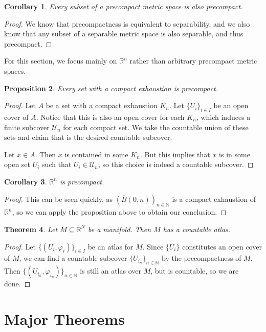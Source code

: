 \documentclass{article}
\newcommand{\cl}[1]{\overline{#1}}
\theoremstyle{plain} %
\newtheorem{thm}{Theorem}
\numberwithin{thm}{section} %
\newtheorem{prop}[thm]{Proposition}
\newtheorem{cor}[thm]{Corollary}
\theoremstyle{definition}
\begin{document}
    \begin{cor}
        Every subset of a precompact metric space is also precompact.
    \end{cor}
    \begin{proof}
        We know that precompactness is equivalent to separability, and we also know that any subset of a separable metric space is also separable, and thus precompact.
    \end{proof}
    For this section, we focus mainly on \(\mathbb{R}^n\) rather than arbitrary precompact metric spaces.
    \begin{prop}
        Every set with a compact exhaustion is precompact.
    \end{prop}
    \begin{proof}
        Let \(A\) be a set with a compact exhaustion \(K_n\). Let \(\{ U_i \} _{i \in I}\) be an open cover of \(A\). Notice that this is also an open cover for each \(K_n\), which induces a finite subcover \(\mathcal{U}_n\) for each compact set. We take the countable union of these sets and claim that is the desired countable subcover.

        Let \(x \in A\). Then \(x\) is contained in some \(K_n\). But this implies that \(x\) is in some open set \(U_i\) such that \(U_i \in \mathcal{U}_n\), so this choice is indeed a countable subcover.
    \end{proof}
    \begin{cor}
        \(\mathbb{R}^n\) is precompact.
    \end{cor}
    \begin{proof}
        This can be seen quickly, as \(\left( \cl{B}(0, n) \right)_{n \in \mathbb{N}}\) is a compact exhaustion of \(\mathbb{R}^n\), so we can apply the proposition above to obtain our conclusion.
    \end{proof}
    \begin{thm}
        Let \(M \subseteq \mathbb{R}^N\) be a manifold. Then \(M\) has a countable atlas.
    \end{thm}
    \begin{proof}
        Let \(\{ (U_i , \varphi _i) \}_{i \in I}\) be an atlas for \(M\). Since \(\{ U_i \}\) constitutes an open cover of \(M\), we can find a countable subcover \(\{ U_{i_n} \}_{n \in \mathbb{N}}\) by the precompactness of \(M\). Then \(\{ (U_{i_n}, \varphi _{i_n}) \}_{n \in \mathbb{N}}\) is still an atlas over \(M\), but is countable, so we are done.
    \end{proof}
    \section{Major Theorems}
\end{document}
